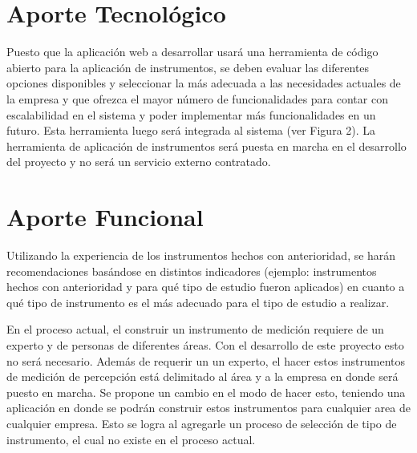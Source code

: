 \section{Aporte Tecnológico}
Puesto que la aplicación web a desarrollar usará una herramienta de código abierto para la aplicación de instrumentos, se deben evaluar las diferentes opciones disponibles y seleccionar la más adecuada a las necesidades actuales de la empresa y que ofrezca el mayor número de funcionalidades para contar con escalabilidad en el sistema y poder implementar más funcionalidades en un futuro. Esta herramienta luego será integrada al sistema (ver Figura 2). La herramienta de aplicación de instrumentos será puesta en marcha en el desarrollo del proyecto y no será un servicio externo contratado.

\section{Aporte Funcional}
Utilizando la experiencia de los instrumentos hechos con anterioridad, se harán recomendaciones basándose en distintos indicadores (ejemplo: instrumentos hechos con anterioridad y para qué tipo de estudio fueron aplicados) en cuanto a qué tipo de instrumento es el más adecuado para el tipo de estudio a realizar. 

En el proceso actual, el construir un instrumento de medición requiere de un experto y de personas de diferentes áreas. Con el desarrollo de este proyecto esto no será necesario. Además de requerir un un experto, el hacer estos instrumentos de medición de percepción está delimitado al área y a la empresa en donde será puesto en marcha. Se propone un cambio en el modo de hacer esto, teniendo una aplicación en donde se podrán construir estos instrumentos para cualquier area de cualquier empresa. Esto se logra al agregarle un proceso de selección de tipo de instrumento, el cual no existe en el proceso actual.
